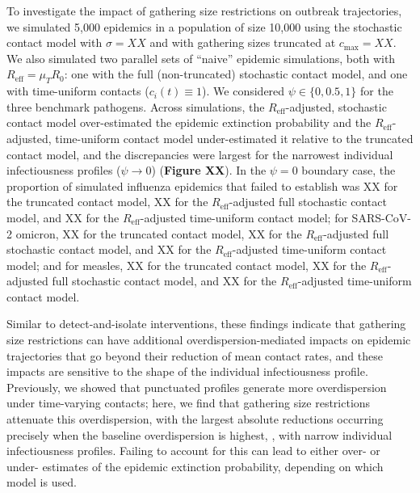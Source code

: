 To investigate the impact of gathering size restrictions on outbreak trajectories, we simulated 5,000 epidemics in a population of size 10,000 using the stochastic contact model with $\sigma = XX$ and with gathering sizes truncated at $c_\text{max} = XX$. We also simulated two parallel sets of ``naive'' epidemic simulations, both with $R_\text{eff} = \mu_T R_0$: one with the full (non-truncated) stochastic contact model, and one with time-uniform contacts ($c_i(t) \equiv 1$). We considered $\psi \in \{0, 0.5, 1\}$ for the three benchmark pathogens. Across simulations, the $R_\text{eff}$-adjusted, stochastic contact model over-estimated the epidemic extinction probability and the $R_\text{eff}$-adjusted, time-uniform contact model under-estimated it relative to the truncated contact model, and the discrepancies were largest for the narrowest individual infectiousness profiles ($\psi \rightarrow 0$) ({\bf Figure XX}). In the $\psi = 0$ boundary case, the proportion of simulated influenza epidemics that failed to establish was XX for the truncated contact model, XX for the $R_\text{eff}$-adjusted full stochastic contact model, and XX for the $R_\text{eff}$-adjusted time-uniform contact model; for SARS-CoV-2 omicron, XX for the truncated contact model, XX for the $R_\text{eff}$-adjusted full stochastic contact model, and XX for the $R_\text{eff}$-adjusted time-uniform contact model; and for measles, XX for the truncated contact model, XX for the $R_\text{eff}$-adjusted full stochastic contact model, and XX for the $R_\text{eff}$-adjusted time-uniform contact model. 

Similar to detect-and-isolate interventions, these findings indicate that gathering size restrictions can have additional overdispersion-mediated impacts on epidemic trajectories that go beyond their reduction of mean contact rates, and these impacts are sensitive to the shape of the individual infectiousness profile. Previously, we showed that punctuated profiles generate more overdispersion under time-varying contacts; here, we find that gathering size restrictions attenuate this overdispersion, with the largest absolute reductions occurring precisely when the baseline overdispersion is highest, \ie, with narrow individual infectiousness profiles. Failing to account for this can lead to either over- or under- estimates of the epidemic extinction probability, depending on which model is used. 
































